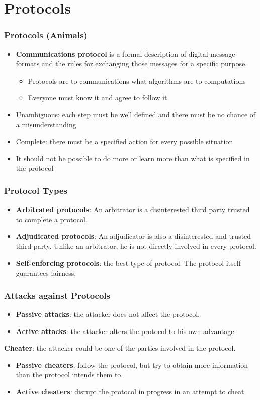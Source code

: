 \section{Protocols}
\begin{frame}\frametitle{Protocols (Animals)}
\begin{itemize}
\item \textbf{Communications protocol} is a formal description of digital message formats and the rules for exchanging those messages for a specific purpose.
\begin{itemize}
\item Protocols are to communications what algorithms are to computations
\item Everyone must know it and agree to follow it
\end{itemize}
\item Unambiguous: each step must be well defined and there must be no chance of a misunderstanding
\item Complete: there must be a specified action for every possible situation
\item It should not be possible to do more or learn more than what is specified in the protocol
\end{itemize}
\end{frame}
\begin{frame}\frametitle{Protocol Types}
\begin{itemize}
\item \textbf{Arbitrated protocols}: An arbitrator is a disinterested third party trusted to complete a protocol.
\item \textbf{Adjudicated protocols}: An adjudicator is also a disinterested and trusted third party. Unlike an arbitrator, he is not directly involved in every protocol.
\item \textbf{Self-enforcing protocols}: the best type of protocol. The protocol itself guarantees fairness.
\end{itemize}
\end{frame}
\begin{frame}\frametitle{Attacks against Protocols}
\begin{itemize}
\item \textbf{Passive attacks}: the attacker does not affect the protocol.
\item \textbf{Active attacks}: the attacker alters the protocol to his own advantage.
\end{itemize}
\textbf{Cheater}: the attacker could be one of the parties involved in the protocol.
\begin{itemize}
\item \textbf{Passive cheaters}: follow the protocol, but try to obtain more information than the protocol intends them to.
\item \textbf{Active cheaters}: disrupt the protocol in progress in an attempt to cheat.
\end{itemize}
\end{frame}

